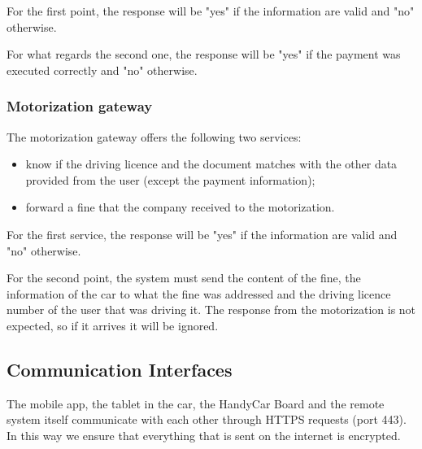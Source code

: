 For the first point, the response will be "yes" if the information are valid and "no" otherwise.

For what regards the second one, the response will be "yes" if the payment was executed correctly and "no" otherwise.

\subsubsection{Motorization gateway}
The motorization gateway offers the following two services:
\begin{itemize}
\item know if the driving licence and the document matches with the other data provided from the user (except the payment information);
\item forward a fine that the company received to the motorization.
\end{itemize}

For the first service, the response will be "yes" if the information are valid and "no" otherwise.

For the second point, the system must send the content of the fine, the information of the car to what the fine was addressed and the driving licence number of the user that was driving it. The response from the motorization is not expected, so if it arrives it will be ignored.

\subsection{Communication Interfaces}
The mobile app, the tablet in the car, the HandyCar Board and the remote system itself communicate with each other through HTTPS requests (port 443). In this way we ensure that everything that is sent on the internet is encrypted.
